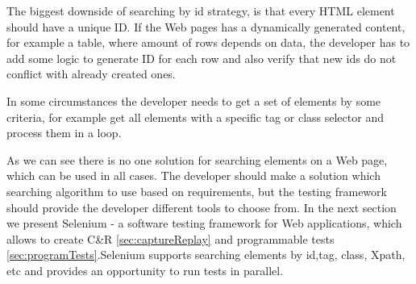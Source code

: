 		The biggest downside of searching by id strategy, is that every HTML element
		should have a unique ID. If the Web pages has a dynamically generated content,
		for example a table, where amount of rows depends on data, the
		developer has to add some logic to generate ID for each row and also verify
		that new ids do not conflict with already created ones. 
		
		In some circumstances the developer needs to get a set of elements by some
		criteria, for example get all elements with a specific tag or class selector
		and process them in a loop. 
		
		As we can see there is no one solution for searching elements on a Web page,
		which can be used in all cases. The developer should make a solution which
		searching algorithm to use based on requirements, but the testing framework
		should provide the developer different tools to choose from. In the next
		section we present Selenium - a software testing framework for Web
		applications, which allows to create C\&R \ref{sec:captureReplay} and 
        programmable tests \ref{sec:programTests}.Selenium  supports searching
        elements by id,tag, class, Xpath, etc and provides an opportunity to run tests in
        parallel.
		

 